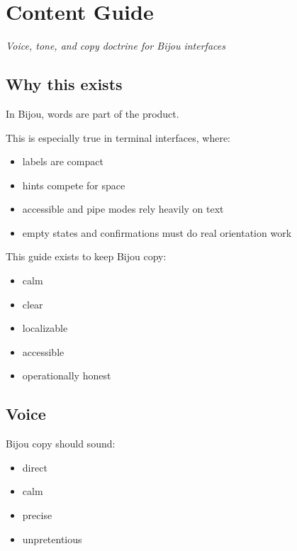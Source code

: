 \chapter{Content Guide}\label{record-040}

\smallskip

\emph{Voice, tone, and copy doctrine for Bijou interfaces}

\section{Why this exists}\label{record-040-why-this-exists}

In Bijou, words are part of the product.

This is especially true in terminal interfaces, where:

\begin{itemize}
\tightlist
\item
  labels are compact
\item
  hints compete for space
\item
  accessible and pipe modes rely heavily on text
\item
  empty states and confirmations must do real orientation work
\end{itemize}

This guide exists to keep Bijou copy:

\begin{itemize}
\tightlist
\item
  calm
\item
  clear
\item
  localizable
\item
  accessible
\item
  operationally honest
\end{itemize}

\section{Voice}\label{record-040-voice}

Bijou copy should sound:

\begin{itemize}
\tightlist
\item
  direct
\item
  calm
\item
  precise
\item
  unpretentious
\end{itemize}

